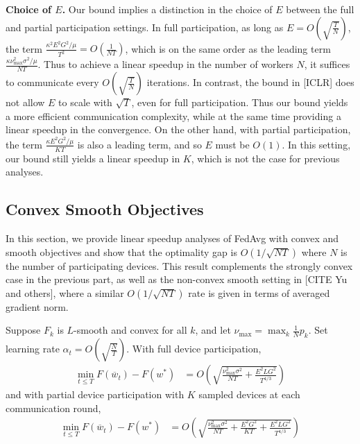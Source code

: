 %
\begin{remark}
	\textbf{Choice of $E$.} Our bound implies a distinction in the choice
	of $E$ between the full and partial participation settings. In full
	participation, as long as $E=O(\sqrt{\frac{T}{N}})$, the term $\frac{\kappa^{2}E^{2}G^{2}/\mu}{T^{2}}=O(\frac{1}{NT})$,
	which is on the same order as the leading term $\frac{\kappa\nu_{\max}^{2}\sigma^{2}/\mu}{NT}$.
	Thus to achieve a linear speedup in the number of workers $N$, it
	suffices to communicate every $O(\sqrt{\frac{T}{N}})$ iterations.
	In contrast, the bound in {[}ICLR{]} does not allow $E$ to scale
	with $\sqrt{T}$, even for full participation. Thus our bound yields
	a more efficient communication complexity, while at the same time
	providing a linear speedup in the convergence. On the other hand,
	with partial participation, the term $\frac{\kappa E^{2}G^{2}/\mu}{KT}$
	is also a leading term, and so $E$ must be $O(1)$. In this setting,
	our bound still yields a linear speedup in $K$, which is not the
	case for previous analyses. 
\end{remark}

\subsection{Convex Smooth Objectives}

In this section, we provide linear speedup analyses of FedAvg with
convex and smooth objectives and show that the optimality gap is $O(1/\sqrt{NT})$
where $N$ is the number of participating devices. This result complements
the strongly convex case in the previous part, as well as the non-convex
smooth setting in {[}CITE Yu and others{]}, where a similar $O(1/\sqrt{NT})$
rate is given in terms of averaged gradient norm. 
\begin{theorem}
	Suppose $F_{k}$ is $L$-smooth and convex for all $k$, and let $\nu_{\max}=\max_{k}\frac{1}{N}p_{k}$.
	Set learning rate $\alpha_{t}=O\left(\sqrt{\frac{N}{T}}\right)$. With full device participation, 
	\begin{align*}
	\min_{t\leq T}F(\overline{w}_{t})-F(w^{\ast}) & =O\left(\sqrt{\frac{\nu_{\max}^{2}\sigma^{2}}{NT}+\frac{E^{2}LG^{2}}{T^{4/3}}}\right)
	\end{align*}
	and with partial device participation with $K$ sampled devices at
	each communication round, 
	\begin{align*}
	\min_{t\leq T}F(\overline{w}_{t})-F(w^{\ast}) & =O\left(\sqrt{\frac{\nu_{\max}^{2}\sigma^{2}}{NT}+\frac{E^{2}G^{2}}{KT}+\frac{E^{2}LG^{2}}{T^{4/3}}}\right)
	\end{align*}
\end{theorem}

